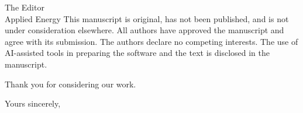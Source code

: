 \documentclass[11pt]{letter}
\begin{document}
\begin{letter}{The Editor\\Applied Energy}
This manuscript is original, has not been published, and is not under consideration elsewhere. All authors have
approved the manuscript and agree with its submission. The authors declare no competing interests. The use of
AI-assisted tools in preparing the software and the text is disclosed in the manuscript.

Thank you for considering our work.

\closing{Yours sincerely,}
\end{letter}
\end{document}
